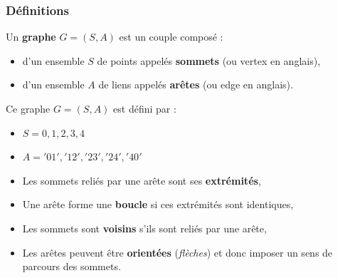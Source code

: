 \begin{frame}[fragile]
\frametitle{Définitions}

\vspace{0.5cm}

\begin{defi}
Un \textbf{graphe} $G = (S,A)$ est un couple composé :
\begin{itemize}
\item d'un ensemble $S$ de points appelés \textbf{sommets} (ou vertex en anglais),
\item d'un ensemble $A$ de liens appelés \textbf{arêtes} (ou edge en anglais).
\end{itemize} 
\end{defi}

\begin{minipage}[l]{0.4\linewidth}
\begin{center}
\end{center}
\end{minipage}
\begin{minipage}[l]{0.4\linewidth}
Ce graphe $G=(S,A)$ est défini par :
\begin{itemize}
\item $S={0,1,2,3,4}$
\item $A={'01','12','23','24','40'}$
\end{itemize}
\medskip
\end{minipage}

\begin{itemize}
 \item Les sommets reliés par une arête sont ses \textbf{extrémités},
 \item Une arête forme une \textbf{boucle} si ces extrémités sont identiques,
 \item Les sommets sont \textbf{voisins} s’ils sont reliés par une arête,
 \item Les arêtes peuvent être \textbf{orientées} (\textit{flèches}) et donc imposer un sens de parcours des sommets.
\end{itemize}
\end{frame}

